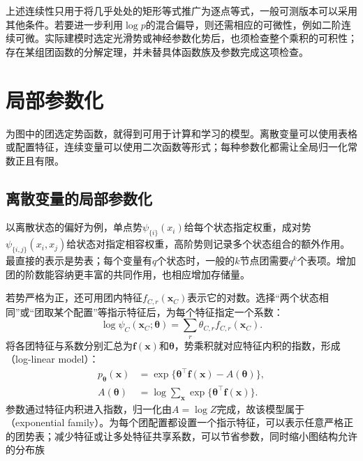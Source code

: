 上述连续性只用于将几乎处处的矩形等式推广为逐点等式，一般可测版本可以采用其他条件。若要进一步利用$\log p$的混合偏导，则还需相应的可微性，例如二阶连续可微。实际建模时选定光滑势或神经参数化势后，也须检查整个乘积的可积性；存在某组团函数的分解定理，并未替具体函数族及参数完成这项检查。

\section{局部参数化}
\label{sec:pgm-undirected-local-parameterization}

为图中的团选定势函数，就得到可用于计算和学习的模型。离散变量可以使用表格或配置特征，连续变量可以使用二次函数等形式；每种参数化都需让全局归一化常数正且有限。

\subsection{离散变量的局部参数化}
\label{sec:pgm-undirected-discrete-parameterization}

以离散状态的偏好为例，单点势$\psi_{\{i\}}(x_i)$给每个状态指定权重，成对势$\psi_{\{i,j\}}(x_i,x_j)$给状态对指定相容权重，高阶势则记录多个状态组合的额外作用。最直接的表示是势表；每个变量有$q$个状态时，一般的$k$节点团需要$q^k$个表项。增加团的阶数能容纳更丰富的共同作用，也相应增加存储量。

若势严格为正，还可用团内特征$f_{C,r}(\bm{x}_C)$表示它的对数。选择“两个状态相同”或“团取某个配置”等指示特征后，为每个特征指定一个系数：
\[
  \log\psi_C(\bm{x}_C;\bm{\theta})
  =\sum_r\theta_{C,r}f_{C,r}(\bm{x}_C).
\]
将各团特征与系数分别汇总为$\bm{f}(\bm{x})$和$\bm{\theta}$，势乘积就对应特征内积的指数，形成（log-linear model）：
\begin{equation}
  \begin{aligned}
    p_{\bm{\theta}}(\bm{x})
      &=\exp\{\bm{\theta}^{\top}\bm{f}(\bm{x})-A(\bm{\theta})\},\\
    A(\bm{\theta})
      &=\log\sum_{\bm{x}}
          \exp\{\bm{\theta}^{\top}\bm{f}(\bm{x})\}.
  \end{aligned}
  \label{eq:pgm-undirected-exponential-family}
\end{equation}
参数通过特征内积进入指数，归一化由$A=\log Z$完成，故该模型属于（exponential family）。为每个团配置都设置一个指示特征，可以表示任意严格正的团势表；减少特征或让多处特征共享系数，可以节省参数，同时缩小图结构允许的分布族

